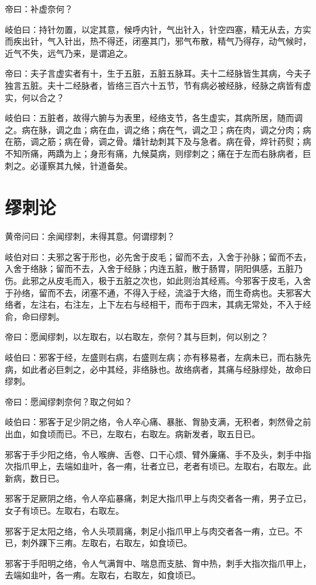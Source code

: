 \documentclass{article}%
\begin{document}
帝曰：补虚奈何？

岐伯曰：持针勿置，以定其意，候呼内针，气出针入，针空四塞，精无从去，方实而疾出针，气入针出，热不得还，闭塞其门，邪气布散，精气乃得存，动气候时，近气不失，远气乃来，是谓追之。

帝曰：夫子言虚实者有十，生于五脏，五脏五脉耳。夫十二经脉皆生其病，今夫子独言五脏。夫十二经脉者，皆络三百六十五节，节有病必被经脉，经脉之病皆有虚实，何以合之？

岐伯曰：五脏者，故得六腑与为表里，经络支节，各生虚实，其病所居，随而调之。病在脉，调之血；病在血，调之络；病在气，调之卫；病在肉，调之分肉；病在筋，调之筋；病在骨，调之骨。燔针劫刺其下及与急者。病在骨，焠针药熨；病不知所痛，两蹻为上；身形有痛，九候莫病，则缪刺之；痛在于左而右脉病者，巨刺之。必谨察其九候，针道备矣。
\section{缪刺论}
黄帝问曰：余闻缪刺，未得其意。何谓缪刺？

岐伯对曰：夫邪之客于形也，必先舍于皮毛；留而不去，入舍于孙脉；留而不去，入舍于络脉；留而不去，入舍于经脉；内连五脏，散于肠胃，阴阳俱感，五脏乃伤。此邪之从皮毛而入，极于五脏之次也，如此则治其经焉。今邪客于皮毛，入舍于孙络，留而不去，闭塞不通，不得入于经，流溢于大络，而生奇病也。夫邪客大络者，左注右，右注左，上下左右与经相干，而布于四末，其病无常处，不入于经俞，命曰缪刺。

帝曰：愿闻缪刺，以左取右，以右取左，奈何？其与巨刺，何以别之？

岐伯曰：邪客于经，左盛则右病，右盛则左病；亦有移易者，左病未已，而右脉先病，如此者必巨刺之，必中其经，非络脉也。故络病者，其痛与经脉缪处，故命曰缪刺。

帝曰：愿闻缪刺奈何？取之何如？

岐伯曰：邪客于足少阴之络，令人卒心痛、暴胀、胷胁支满，无积者，刺然骨之前出血，如食顷而已。不已，左取右，右取左。病新发者，取五日已。

邪客于手少阳之络，令人喉痹、舌卷、口干心烦、臂外廉痛、手不及头，刺手中指次指爪甲上，去端如韭叶，各一痏，壮者立已，老者有顷已。左取右，右取左。此新病，数日已。

邪客于足厥阴之络，令人卒疝暴痛，刺足大指爪甲上与肉交者各一痏，男子立已，女子有顷已。左取右，右取左。

邪客于足太阳之络，令人头项肩痛，刺足小指爪甲上与肉交者各一痏，立已。不已，刺外踝下三痏。左取右，右取左，如食顷已。

邪客于手阳明之络，令人气满胷中、喘息而支胠、胷中热，刺手大指次指爪甲上，去端如韭叶，各一痏。左取右，右取左，如食顷已。
\end{document}
